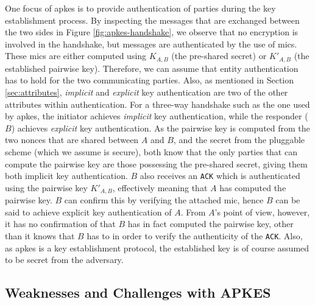 One focus of \gls{apkes} is to provide authentication of parties during the key establishment process. By inspecting the messages that are exchanged between the two sides in Figure \ref{fig:apkes-handshake}, we observe that no encryption is involved in the handshake, but messages are authenticated by the use of \gls{mic}s. These \gls{mic}s are either computed using $K_{A,B}$ (the pre-shared secret) or $K'_{A,B}$ (the established pairwise key). Therefore, we can assume that entity authentication has to hold for the two communicating parties. Also, as mentioned in Section \ref{sec:attributes}, \emph{implicit} and \emph{explicit} key authentication are two of the other attributes within authentication. For a three-way handshake such as the one used by \gls{apkes}, the initiator achieves \emph{implicit} key authentication, while the responder ($B$) achieves \emph{explicit} key authentication. As the pairwise key is computed from the two nonces that are shared between $A$ and $B$, and the secret from the pluggable scheme (which we assume is secure), both know that the only parties that can compute the pairwise key are those possessing the pre-shared secret, giving them both implicit key authentication. $B$ also receives an \texttt{ACK} which is authenticated using the pairwise key $K'_{A,B}$, effectively meaning that $A$ has computed the pairwise key. $B$ can confirm this by verifying the attached \gls{mic}, hence $B$ can be said to achieve explicit key authentication of $A$. From $A$'s point of view, however, it has no confirmation of that $B$ has in fact computed the pairwise key, other than it knows that $B$ has to in order to verify the authenticity of the \texttt{ACK}. Also, as \gls{apkes} is a key establishment protocol, the established key is of course assumed to be secret from the adversary.

\subsection{Weaknesses and Challenges with APKES}
\label{subsec:apkes-weakness}

